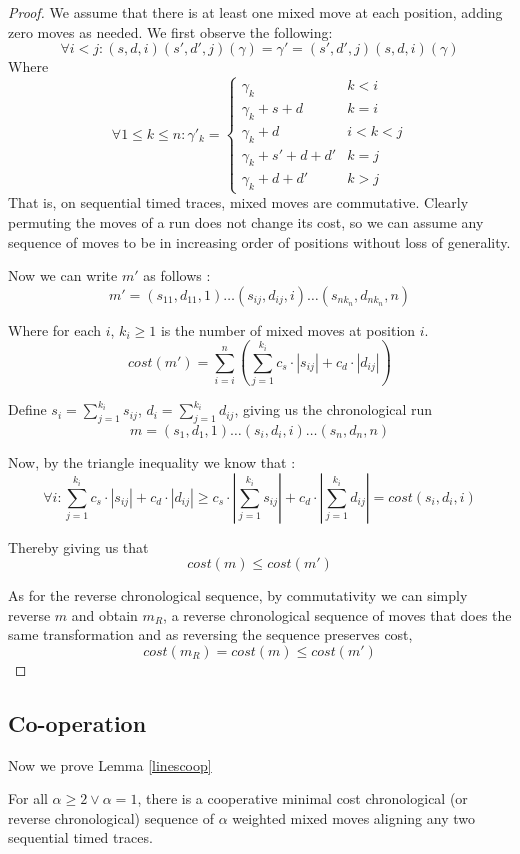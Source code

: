\documentclass[runningheads]{llncs}
\newcounter{cases}
\begin{document}
\begin{proof}
We assume that there is at least one mixed move at each position, adding zero moves as needed. We first observe the following: 
$$\forall  i < j : (s, d, i)(s', d', j)(\gamma) = \gamma' = (s', d', j)(s, d, i)(\gamma)$$
Where $$\forall 1 \leq k \leq n : \gamma'_k = \begin{cases}
\gamma_k & k <i \\
\gamma_k + s + d & k = i \\
\gamma_k + d & i < k < j \\
\gamma_k + s' + d + d' & k = j \\
\gamma_k + d + d' & k > j
\end{cases}$$
That is, on sequential timed traces, mixed moves are commutative. 
Clearly permuting the moves of a run does not change its cost, so we can assume any sequence of moves to be in increasing order of positions without loss of generality.

Now we can write $m'$ as follows : 
$$m' = (s_{11}, d_{11}, 1)\dots (s_{ij}, d_{ij}, i)\dots(s_{nk_n}, d_{nk_n}, n)$$ 

Where for each $i$, $k_i \geq 1$ is the number of mixed moves at position $i$. 
$$cost(m') = \sum_{i = i}^{n} (\sum_{j = 1}^{k_i} c_s\cdot|s_{ij}| + c_d \cdot|d_{ij}|)$$ 

Define $s_i = \sum_{j = 1}^{k_i} s_{ij}$, $d_i =\sum_{j = 1}^{k_i} d_{ij}$, giving us the chronological run $$m = (s_1, d_1, 1)\dots (s_i, d_i, i)\dots (s_n, d_n, n)$$

Now, by the triangle inequality we know that : 
$$\forall i : \sum_{j = 1}^{k_i} c_s \cdot|s_{ij}| + c_d \cdot|d_{ij}| \geq c_s \cdot| \sum_{j = 1}^{k_i} s_{ij} | + c_d \cdot| \sum_{j = 1}^{k_i} d_{ij} | = cost(s_i, d_i, i) $$

Thereby giving us that $$cost(m) \leq cost(m')$$ 

As for the reverse chronological sequence, by commutativity we can simply reverse $m$ and obtain $m_R$, a reverse chronological sequence of moves that does the same transformation and as reversing the sequence preserves cost, $$cost(m_R) = cost(m) \leq cost(m')$$ 
\end{proof}

\subsection{Co-operation} 
Now we prove Lemma \ref{linescoop}
\begin{lemma*}\label{linescoop} For all $\alpha \geq 2 \vee \alpha = 1$, there is a cooperative minimal cost chronological (or reverse chronological) sequence of $\alpha$ weighted mixed moves aligning any two sequential timed traces. 
\end{lemma*}
\end{document}
